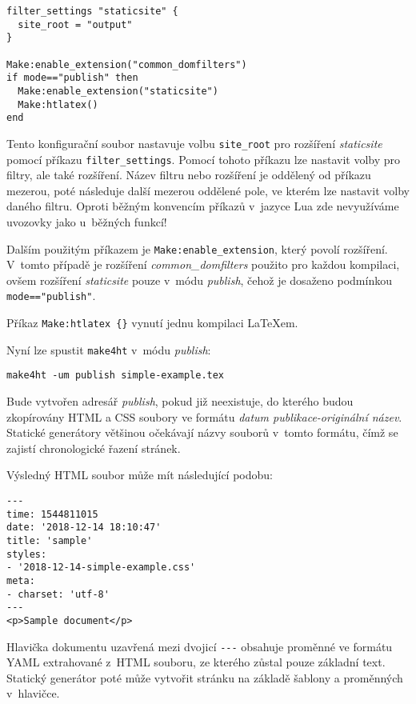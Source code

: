 \documentclass{csbulletin}
\newcommand\nazev[1]{\textit{#1}}
\newcommand\prikaz[1]{\texttt{#1}}
\begin{document}
\begin{verbatim}
filter_settings "staticsite" {
  site_root = "output" 
}

Make:enable_extension("common_domfilters")
if mode=="publish" then
  Make:enable_extension("staticsite")
  Make:htlatex()
end

\end{verbatim}

Tento konfigurační soubor nastavuje volbu \texttt{site\_root} pro rozšíření
\nazev{staticsite} pomocí příkazu \verb|filter_settings|. Pomocí tohoto příkazu
lze nastavit volby pro filtry, ale také rozšíření. Název filtru nebo rozšíření
je oddělený od příkazu mezerou, poté následuje další mezerou oddělené pole, ve
kterém lze nastavit volby daného filtru. Oproti běžným konvencím příkazů
v~jazyce Lua zde nevyužíváme uvozovky jako u~běžných funkcí!

Dalším použitým příkazem je \verb|Make:enable_extension|, který povolí
rozšíření. V~tomto případě je rozšíření \nazev{common\_domfilters} použito pro
každou kompilaci, ovšem rozšíření \nazev{staticsite} pouze v~módu
\nazev{publish}, čehož je dosaženo podmínkou \verb|mode=="publish"|.

Příkaz \verb|Make:htlatex {}| vynutí jednu kompilaci \LaTeX em. 

Nyní lze spustit \prikaz{make4ht} v~módu \nazev{publish}: 

\begin{verbatim}
make4ht -um publish simple-example.tex
\end{verbatim}

Bude vytvořen adresář \nazev{publish}, pokud již neexistuje, do kterého budou
zkopírovány HTML a CSS soubory ve formátu \textit{datum publikace-originální
název}. Statické generátory většinou očekávají názvy souborů v~tomto formátu,
čímž se zajistí chronologické řazení stránek.

Výsledný HTML soubor může mít následující podobu:

\begin{verbatim}
---
time: 1544811015
date: '2018-12-14 18:10:47'
title: 'sample'
styles:
- '2018-12-14-simple-example.css'
meta:
- charset: 'utf-8'
---
<p>Sample document</p>
\end{verbatim}


Hlavička dokumentu uzavřená mezi dvojicí \verb|---| obsahuje proměnné ve
formátu YAML extrahované z~HTML souboru, ze kterého zůstal pouze základní text.
Statický generátor poté může vytvořit stránku na základě šablony a proměnných
v~hlavičce. 
\end{document}
